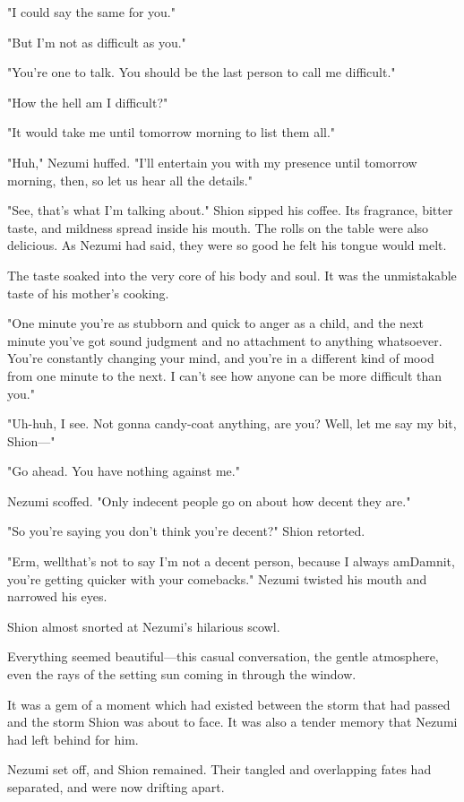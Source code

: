 "I could say the same for you."

"But I'm not as difficult as you."

"You're one to talk. You should be the last person to call me
difficult."

"How the hell am I difficult?"

"It would take me until tomorrow morning to list them all."

"Huh," Nezumi huffed. "I'll entertain you with my presence until
tomorrow morning, then, so let us hear all the details."

"See, that's what I'm talking about." Shion sipped his coffee. Its
fragrance, bitter taste, and mildness spread inside his mouth. The rolls
on the table were also delicious. As Nezumi had said, they were so good
he felt his tongue would melt.

The taste soaked into the very core of his body and soul. It was the
unmistakable taste of his mother's cooking.

"One minute you're as stubborn and quick to anger as a child, and the
next minute you've got sound judgment and no attachment to anything
whatsoever. You're constantly changing your mind, and you're in a
different kind of mood from one minute to the next. I can't see how
anyone can be more difficult than you."

"Uh-huh, I see. Not gonna candy-coat anything, are you? Well, let me say
my bit, Shion---"

"Go ahead. You have nothing against me."

Nezumi scoffed. "Only indecent people go on about how decent they are."

"So you're saying you don't think you're decent?" Shion retorted.

"Erm, well\el that's not to say I'm not a decent person, because I
always am\el Damnit, you're getting quicker with your comebacks."
Nezumi twisted his mouth and narrowed his eyes.

Shion almost snorted at Nezumi's hilarious scowl.

Everything seemed beautiful---this casual conversation, the gentle
atmosphere, even the rays of the setting sun coming in through the
window.

It was a gem of a moment which had existed between the storm that had
passed and the storm Shion was about to face. It was also a tender
memory that Nezumi had left behind for him.

\mybreak

Nezumi set off, and Shion remained. Their tangled and overlapping fates
had separated, and were now drifting apart.

